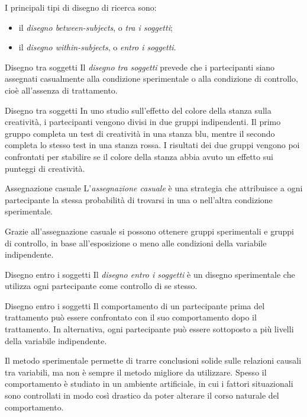 \documentclass[a4paper]{article}
\begin{document}
I principali tipi di disegno di ricerca sono:
\begin{itemize}
    \item il \emph{disegno between-subjects}, o \emph{tra i soggetti};
    \item il \emph{disegno within-subjects}, o \emph{entro i soggetti}.
\end{itemize}
\begin{snippetdefinition}{Disegno tra soggetti}
    Il \emph{disegno tra soggetti} prevede che i partecipanti siano assegnati casualmente alla condizione sperimentale o alla condizione di controllo, cioè all'assenza di trattamento.
\end{snippetdefinition}
\begin{snippetexample}{Disegno tra soggetti}
    In uno studio sull'effetto del colore della stanza sulla creatività, i partecipanti vengono divisi in due gruppi indipendenti. Il primo gruppo completa un test di creatività in una stanza blu, mentre il secondo completa lo stesso test in una stanza rossa. I risultati dei due gruppi vengono poi confrontati per stabilire se il colore della stanza abbia avuto un effetto sui punteggi di creatività.
\end{snippetexample}
\begin{snippetdefinition}{Assegnazione casuale}
    L'\emph{assegnazione casuale} è una strategia che attribuisce a ogni partecipante la stessa probabilità di trovarsi in una o nell'altra condizione sperimentale.
\end{snippetdefinition}
Grazie all'assegnazione casuale si possono ottenere gruppi sperimentali e gruppi di controllo, in base all'esposizione o meno alle condizioni della variabile indipendente.
\begin{snippetdefinition}{Disegno entro i soggetti}
    Il \emph{disegno entro i soggetti} è un disegno sperimentale che utilizza ogni partecipante come controllo di se stesso.
\end{snippetdefinition}
\begin{snippetexample}{Disegno entro i soggetti}
    Il comportamento di un partecipante prima del trattamento può essere confrontato con il suo comportamento dopo il trattamento. In alternativa, ogni partecipante può essere sottoposto a più livelli della variabile indipendente.
\end{snippetexample}
Il metodo sperimentale permette di trarre conclusioni solide sulle relazioni causali tra variabili, ma non è sempre il metodo migliore da utilizzare. Spesso il comportamento è studiato in un ambiente artificiale, in cui i fattori situazionali sono controllati in modo così drastico da poter alterare il corso naturale del comportamento.
\end{document}
